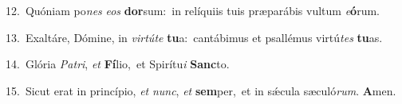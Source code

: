{\numbfont\textcolor{\numbcolor}{12.}}~Quóniam po\textit{nes} \textit{e}\-\textit{os} \textbf{dor}\-sum:~\star in relíquiis tuis præparábis vultum \textit{e}\-\textbf{ó}rum.\par
{\numbfont\textcolor{\numbcolor}{13.}}~Exaltáre, Dómine, in \textit{vir}\-\textit{tú}\textit{te} \textbf{tu}\-a:~\star cantábimus et psallémus virtú\textit{tes} \textbf{tu}\-as.\par
{\numbfont\textcolor{\numbcolor}{14.}}~Glória \textit{Pa}\-\textit{tri}, \textit{et} \textbf{Fí}\-lio,~\star et Spirítu\textit{i} \textbf{Sanc}\-to.\par
{\numbfont\textcolor{\numbcolor}{15.}}~Sicut erat in princípio, \textit{et} \textit{nunc}\-, \textit{et} \textbf{sem}\-per,~\star et in sǽcula sæculó\-\textit{rum}\-. \textbf{A}\-men.\par
